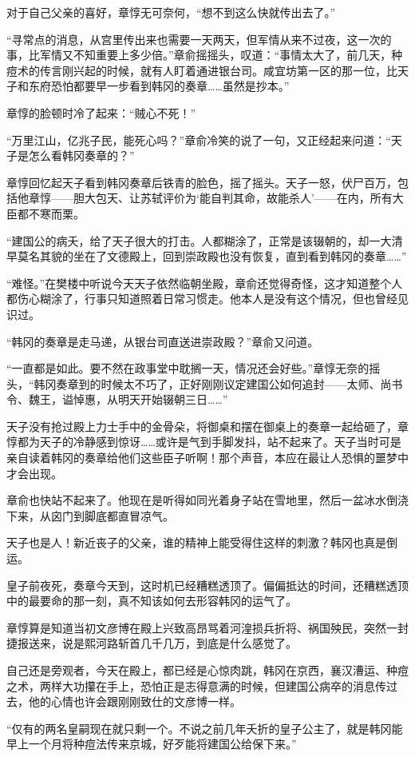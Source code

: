 对于自己父亲的喜好，章惇无可奈何，“想不到这么快就传出去了。”

“寻常点的消息，从宫里传出来也需要一天两天，但军情从来不过夜，这一次的事，比军情又不知重要上多少倍。”章俞摇摇头，叹道：“事情太大了，前几天，种痘术的传言刚兴起的时候，就有人盯着通进银台司。咸宜坊第一区的那一位，比天子和东府恐怕都要早一步看到韩冈的奏章……虽然是抄本。”

章惇的脸顿时冷了起来：“贼心不死！”

“万里江山，亿兆子民，能死心吗？”章俞冷笑的说了一句，又正经起来问道：“天子是怎么看韩冈奏章的？”

章惇回忆起天子看到韩冈奏章后铁青的脸色，摇了摇头。天子一怒，伏尸百万，包括他章惇——胆大包天、让苏轼评价为‘能自判其命，故能杀人’——在内，所有大臣都不寒而栗。

“建国公的病夭，给了天子很大的打击。人都糊涂了，正常是该辍朝的，却一大清早莫名其貌的坐在了文德殿上，回到崇政殿也没有恢复，直到看到韩冈的奏章……”

“难怪。”在樊楼中听说今天天子依然临朝坐殿，章俞还觉得奇怪，这才知道整个人都伤心糊涂了，行事只知道照着日常习惯走。他本人是没有这个情况，但也曾经见识过。

“韩冈的奏章是走马递，从银台司直送进崇政殿？”章俞又问道。

“一直都是如此。要不然在政事堂中耽搁一天，情况还会好些。”章惇无奈的摇头，“韩冈奏章到的时候太不巧了，正好刚刚议定建国公如何追封——太师、尚书令、魏王，谥悼惠，从明天开始辍朝三日……”

天子没有抢过殿上力士手中的金骨朵，将御桌和摆在御桌上的奏章一起给砸了，章惇都为天子的冷静感到惊讶……或许是气到手脚发抖，站不起来了。天子当时可是亲自读着韩冈的奏章给他们这些臣子听啊！那个声音，本应在最让人恐惧的噩梦中才会出现。

章俞也快站不起来了。他现在是听得如同光着身子站在雪地里，然后一盆冰水倒浇下来，从囟门到脚底都直冒凉气。

天子也是人！新近丧子的父亲，谁的精神上能受得住这样的刺激？韩冈也真是倒运。

皇子前夜死，奏章今天到，这时机已经糟糕透顶了。偏偏抵达的时间，还糟糕透顶中的最要命的那一刻，真不知该如何去形容韩冈的运气了。

章惇算是知道当初文彦博在殿上兴致高昂骂着河湟损兵折将、祸国殃民，突然一封捷报送来，说是熙河路斩首几千几万，到底是什么感觉了。

自己还是旁观者，今天在殿上，都已经是心惊肉跳，韩冈在京西，襄汉漕运、种痘之术，两样大功攥在手上，恐怕正是志得意满的时候，但建国公病卒的消息传过去，他的心情也许会跟刚刚致仕的文彦博一样。

“仅有的两名皇嗣现在就只剩一个。不说之前几年夭折的皇子公主了，就是韩冈能早上一个月将种痘法传来京城，好歹能将建国公给保下来。”

